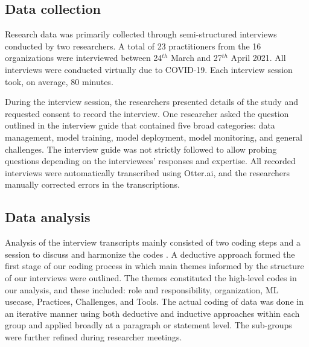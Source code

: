 \subsection{Data collection}
Research data was primarily collected through semi-structured interviews conducted by two researchers. A total of 23 practitioners from the 16 organizations were interviewed between 24$^{th}$ March and 27$^{th}$ April 2021. All interviews were conducted virtually due to COVID-19. Each interview session took, on average, 80 minutes. 

During the interview session, the researchers presented details of the study and requested consent to record the interview. One researcher asked the question outlined in the interview guide that contained five broad categories: data management, model training, model deployment, model monitoring, and general challenges. The interview guide was not strictly followed to allow probing questions depending on the interviewees' responses and expertise. All recorded interviews were automatically transcribed using Otter.ai, and the researchers manually corrected errors in the transcriptions.  



\subsection{Data analysis}
Analysis of the interview transcripts mainly consisted of two coding steps and a session to discuss and harmonize the codes \cite{Runeson2008}. A deductive approach formed the first stage of our coding process in which main themes informed by the structure of our interviews were outlined. The themes constituted the high-level codes in our analysis, and these included: role and responsibility, organization, ML usecase, Practices, Challenges, and Tools. The actual coding of data was done in an iterative manner using both deductive and inductive \cite{Runeson2008} approaches within each group and applied broadly at a paragraph or statement level. The sub-groups were further refined during researcher meetings.

